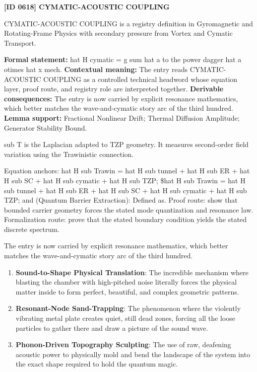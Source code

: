 \clearpage
\noindent\textbf{[ID 0618] CYMATIC-ACOUSTIC COUPLING}\par
\vspace{0.35em}
\begingroup\small
{}
CYMATIC-ACOUSTIC COUPLING is a registry definition in Gyromagnetic and Rotating-Frame Physics with secondary pressure from Vortex and Cymatic Transport.

\begingroup\footnotesize\setlength{\emergencystretch}{3em}\sloppy
\textbf{Formal statement:} hat H cymatic = g sum hat a to the power dagger hat a otimes hat x mech. \textbf{Contextual meaning:} The entry reads CYMATIC-ACOUSTIC COUPLING as a controlled technical headword whose equation layer, proof route, and registry role are interpreted together. \textbf{Derivable consequences:} The entry is now carried by explicit resonance mathematics, which better matches the wave-and-cymatic story arc of the third hundred. \textbf{Lemma support:} Fractional Nonlinear Drift; Thermal Diffusion Amplitude; Generator Stability Bound.\par
\endgroup

sub T is the Laplacian adapted to TZP geometry. It measures second-order field variation using the Trawinistic connection.

Equation anchors: hat H sub Trawin = hat H sub tunnel + hat H sub ER + hat H sub SC + hat H sub cymatic + hat H sub TZP; \$hat H sub Trawin = hat H sub tunnel + hat H sub ER + hat H sub SC + hat H sub cymatic + hat H sub TZP; and (Quantum Barrier Extraction): Defined as. Proof route: show that bounded carrier geometry forces the stated mode quantization and resonance law. Formalization route: prove that the stated boundary condition yields the stated discrete spectrum.

The entry is now carried by explicit resonance mathematics, which better matches the wave-and-cymatic story arc of the third hundred.
\endgroup

\begin{enumerate}[leftmargin=1.6em,itemsep=6pt,topsep=4pt]
\item \textbf{Sound-to-Shape Physical Translation}: The incredible mechanism where blasting the chamber with high-pitched noise literally forces the physical matter inside to form perfect, beautiful, and complex geometric patterns.
\item \textbf{Resonant-Node Sand-Trapping}: The phenomenon where the violently vibrating metal plate creates quiet, still dead zones, forcing all the loose particles to gather there and draw a picture of the sound wave.
\item \textbf{Phonon-Driven Topography Sculpting}: The use of raw, deafening acoustic power to physically mold and bend the landscape of the system into the exact shape required to hold the quantum magic.
\end{enumerate}

